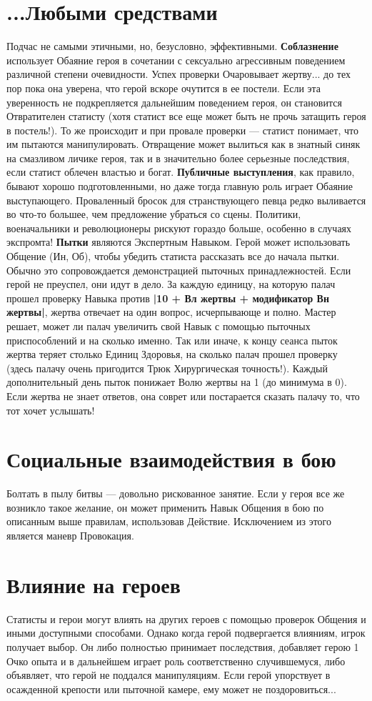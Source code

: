 \section{...Любыми средствами}
Подчас не самыми этичными, но, безусловно, эффективными.
\newline \textbf{Соблазнение} использует Обаяние героя в сочетании с сексуально агрессивным поведением различной степени очевидности. Успех проверки Очаровывает жертву... до тех пор пока она уверена, что герой вскоре очутится в ее постели. Если эта уверенность не подкрепляется дальнейшим поведением героя, он становится Отвратителен статисту (хотя статист все еще может быть не прочь затащить героя в постель!). То же происходит и при провале проверки — статист понимает, что им пытаются манипулировать. Отвращение может вылиться как в знатный синяк на смазливом личике героя, так и в значительно более серьезные последствия, если статист облечен властью и богат.
\newline \textbf{Публичные выступления}, как правило, бывают хорошо подготовленными, но даже тогда главную роль играет Обаяние выступающего. Проваленный бросок для странствующего певца редко выливается во что-то большее, чем предложение убраться со сцены. Политики, военачальники и революционеры рискуют гораздо больше, особенно в случаях экспромта!
\newline \textbf{Пытки} являются Экспертным Навыком. Герой может использовать Общение (Ин, Об), чтобы убедить статиста рассказать все до начала пытки. Обычно это сопровождается демонстрацией пыточных принадлежностей. Если герой не преуспел, они идут в дело. За каждую единицу, на которую палач прошел проверку Навыка против \textbf{|10 + Вл жертвы + модификатор Вн жертвы|}, жертва отвечает на один вопрос, исчерпывающе и полно. Мастер решает, может ли палач увеличить свой Навык с помощью пыточных приспособлений и на сколько именно. Так или иначе, к концу сеанса пыток жертва теряет столько Единиц Здоровья, на сколько палач прошел проверку (здесь палачу очень пригодится Трюк Хирургическая точность!). Каждый дополнительный день пыток понижает Волю жертвы на 1 (до минимума в 0). Если жертва не знает ответов, она соврет или постарается сказать палачу то, что тот хочет услышать!
\section{Социальные взаимодействия в бою}
Болтать в пылу битвы — довольно рискованное занятие. Если у героя все же возникло такое желание, он может применить Навык Общения в бою по описанным выше правилам, использовав Действие. Исключением из этого является маневр Провокация.
\section{Влияние на героев}
Статисты и герои могут влиять на других героев с помощью проверок Общения и иными доступными способами. Однако когда герой подвергается влияниям, игрок получает выбор. Он либо полностью принимает последствия, добавляет герою 1 Очко опыта и в дальнейшем играет роль соответственно случившемуся, либо объявляет, что герой не поддался манипуляциям. Если герой упорствует в осажденной крепости или пыточной камере, ему может не поздоровиться...